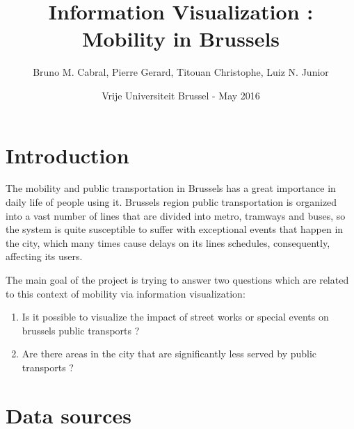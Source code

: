\documentclass[11pt]{article}%
\begin{document}
\title{Information Visualization : Mobility in Brussels}
\author{Bruno M. Cabral, Pierre Gerard, Titouan Christophe, Luiz N. Junior}
\date{Vrije Universiteit Brussel - May 2016}
\maketitle


\section{Introduction}

The mobility and public transportation in Brussels has a great importance in daily life of people using it.  Brussels region public transportation is organized into a vast number of lines that are divided into metro, tramways and buses, so the system is quite susceptible to suffer with exceptional events that happen in the city, which many times cause delays on its lines schedules, consequently, affecting its users.

The main goal of the project is trying to answer two questions which are related to this context of mobility via information visualization:

\begin{enumerate}
	\item Is it possible to visualize the impact of street works or special events on brussels public transports ?
	\item Are there areas in the city that are significantly less served by public transports ?
\end{enumerate}


\section{Data sources}
\end{document}
